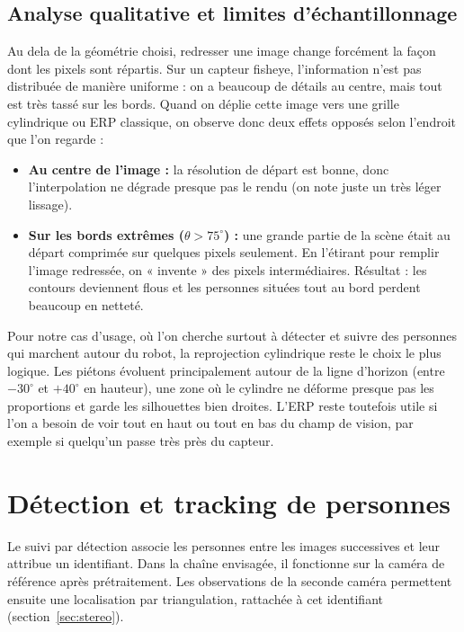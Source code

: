 \documentclass[11pt,a4paper]{article}
\begin{document}
\subsection{Analyse qualitative et limites d'échantillonnage}

Au dela de la géométrie choisi, redresser une image change forcément la façon dont les pixels sont répartis. Sur un capteur fisheye, l'information n'est pas distribuée de manière uniforme : on a beaucoup de détails au centre, mais tout est très tassé sur les bords. Quand on déplie cette image vers une grille cylindrique ou ERP classique, on observe donc deux effets opposés selon l'endroit que l'on regarde :
\begin{itemize}
    \item \textbf{Au centre de l'image :} la résolution de départ est bonne, donc l'interpolation ne dégrade presque pas le rendu (on note juste un très léger lissage).
    \item \textbf{Sur les bords extrêmes ($\theta > 75^\circ$) :} une grande partie de la scène était au départ comprimée sur quelques pixels seulement. En l'étirant pour remplir l'image redressée, on « invente » des pixels intermédiaires. Résultat : les contours deviennent flous et les personnes situées tout au bord perdent beaucoup en netteté.
\end{itemize}

Pour notre cas d'usage, où l'on cherche surtout à détecter et suivre des personnes qui marchent autour du robot, la reprojection cylindrique reste le choix le plus logique. Les piétons évoluent principalement autour de la ligne d'horizon (entre $-30^\circ$ et $+40^\circ$ en hauteur), une zone où le cylindre ne déforme presque pas les proportions et garde les silhouettes bien droites. L'ERP reste toutefois utile si l'on a besoin de voir tout en haut ou tout en bas du champ de vision, par exemple si quelqu'un passe très près du capteur.


\section{Détection et tracking de personnes}
\label{sec:detection-suivi}








Le suivi par détection associe les personnes entre les images successives et leur attribue un identifiant. Dans la chaîne envisagée, il fonctionne sur la caméra de référence après prétraitement. Les observations de la seconde caméra permettent ensuite une localisation par triangulation, rattachée à cet identifiant (section~\ref{sec:stereo}).
\end{document}
